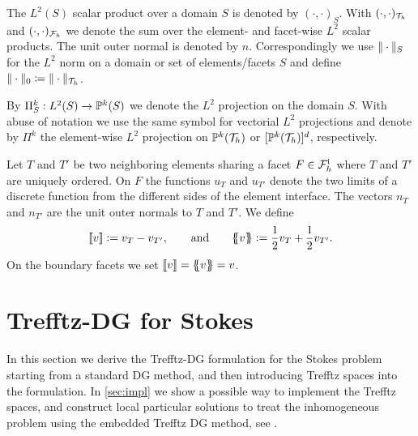 \documentclass[sn-mathphys,Numbered]{sn-jnl}%
\theoremstyle{remark}%
\theoremstyle{definition}%
\begin{document}
The $L^2(S)$ scalar product over a domain $S$ is denoted by $(\cdot,\cdot)_S$.
With $(\cdot,\cdot)_{\mathcal{T}_h}$ and $(\cdot,\cdot)_{\mathcal{F}_h}$ we denote the sum over the
element- and facet-wise $L^2$ scalar products. The unit outer normal is denoted
by $n$. Correspondingly we use $\Vert \cdot \Vert_S$ for the $L^2$ norm on a domain or
set of elements/facets $S$ and define $\Vert \cdot \Vert_0 \coloneqq \Vert \cdot \Vert_{\mathcal{T}_h}$.  

By $\Pi^k_S: L^2(S) \to \mathbb{P}^k(S)$ we denote the $L^2$ projection on the domain $S$. With abuse of notation we use the same symbol for vectorial $L^2$ projections and denote by $\Pi^k$ the element-wise $L^2$ projection on $\mathbb{P}^k({\mathcal{T}_h})$ or $[\mathbb{P}^k({\mathcal{T}_h})]^d$, respectively.

Let $T$ and $T'$ be two neighboring elements sharing a facet $F \in {\mathcal{F}_h^{\text{i}}}$ where $T$ and $T'$ are uniquely ordered. On $F$ the functions $u_{T}$ and $u_{T'}$ denote the two limits of a discrete function from the different sides of the element interface. The vectors $n_T$ and $n_{T'}$ are the unit outer normals to $T$ and $T'$. We define
\begin{equation*}
    [\![v]\!] := v_{T} - v_{T'}, \qquad \text{and} \qquad
    \{\!\!\{ v\}\!\!\} := \frac12 v_{T} + \frac12 v_{T'}.
\end{equation*}
On the boundary facets we set $[\![v]\!] = \{\!\!\{ v\}\!\!\} = v$.



\section{Trefftz-DG for Stokes}\label{sec:tdgstokes}
In this section we derive the Trefftz-DG formulation for the Stokes problem starting from a standard DG method, and then introducing Trefftz spaces into the formulation. 
In \cref{sec:impl} we show a possible way to implement the Trefftz spaces, and construct local particular solutions to treat the inhomogeneous problem using the embedded Trefftz DG method, see \cite{2201.07041}.
\end{document}
